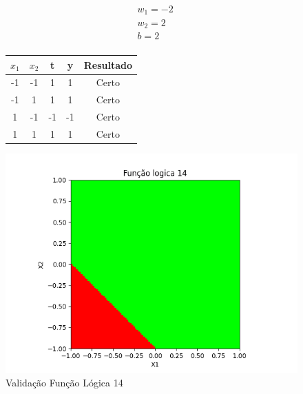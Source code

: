 \begin{figure}[h!]
\centering
\begin{minipage}[c]{0.49\linewidth}
\centering
\[
\begin{aligned}
&w_1 = -2\\
&w_2 = 2\\
&b = 2\\
\end{aligned}
\]
\begin{tabular}{|c|c|c|c|c|}\hline
$x_1$ & $x_2$ & t & y & Resultado\\ \hline
 -1 & -1 & 1 & 1 & Certo\\ \hline
 -1 & 1 & 1 & 1 & Certo\\ \hline
 1 & -1 & -1 & -1 & Certo\\ \hline
 1 & 1 & 1 & 1 & Certo\\ \hline
\end{tabular}
\end{minipage}
\hfill
\begin{minipage}[c]{0.5\linewidth}
\centering
\singlespacing
\includegraphics[width=1.2\textwidth]{im/im14}
\end{minipage}
\caption{Validação Função Lógica 14}
\label{vl14}
\end{figure}

